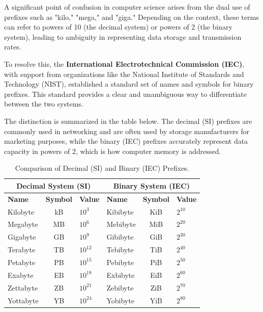 A significant point of confusion in computer science arises from the dual use of prefixes such as "kilo," "mega," and "giga." Depending on the context, these terms can refer to powers of 10 (the decimal system) or powers of 2 (the binary system), leading to ambiguity in representing data storage and transmission rates.

To resolve this, the \textbf{International Electrotechnical Commission (IEC)}, with support from organizations like the National Institute of Standards and Technology (NIST), established a standard set of names and symbols for binary prefixes. This standard provides a clear and unambiguous way to differentiate between the two systems.

The distinction is summarized in the table below. The decimal (SI) prefixes are commonly used in networking and are often used by storage manufacturers for marketing purposes, while the binary (IEC) prefixes accurately represent data capacity in powers of 2, which is how computer memory is addressed.

\begin{table}[h!]
    \centering
    \caption{Comparison of Decimal (SI) and Binary (IEC) Prefixes.}
    \label{tab:si_vs_iec_prefixes}
    \begin{tabular}{|l|c|l||l|c|l|}
        \hline
        \multicolumn{3}{|c||}{\textbf{Decimal System (SI)}} & \multicolumn{3}{c|}{\textbf{Binary System (IEC)}} \\
        \hline
        \textbf{Name} & \textbf{Symbol} & \textbf{Value} & \textbf{Name} & \textbf{Symbol} & \textbf{Value} \\
        \hline
        Kilobyte & kB & $10^3$ & Kibibyte & KiB & $2^{10}$ \\
        Megabyte & MB & $10^6$ & Mebibyte & MiB & $2^{20}$ \\
        Gigabyte & GB & $10^9$ & Gibibyte & GiB & $2^{30}$ \\
        Terabyte & TB & $10^{12}$ & Tebibyte & TiB & $2^{40}$ \\
        Petabyte & PB & $10^{15}$ & Pebibyte & PiB & $2^{50}$ \\
        Exabyte & EB & $10^{18}$ & Exbibyte & EiB & $2^{60}$ \\
        Zettabyte & ZB & $10^{21}$ & Zebibyte & ZiB & $2^{70}$ \\
        Yottabyte & YB & $10^{24}$ & Yobibyte & YiB & $2^{80}$ \\
        \hline
    \end{tabular}
\end{table}

